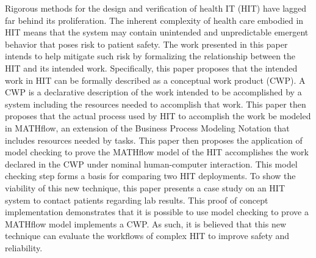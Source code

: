 Rigorous methods for the design and verification of health IT (HIT) have lagged far behind its proliferation. The inherent complexity of health care embodied in HIT means that the system may contain unintended and unpredictable emergent behavior that poses risk to patient safety. The work presented in this paper intends to help mitigate such risk by formalizing the relationship between the HIT and its intended work. Specifically, this paper proposes that the intended work in HIT can be formally described as a conceptual work product (CWP). A CWP is a declarative description of the work intended to be accomplished by a system including the resources needed to accomplish that work. This paper then proposes that the actual process used by HIT to accomplish the work be modeled in MATHflow, an extension of the Business Process Modeling Notation that includes resources needed by tasks. This paper then proposes the application of model checking to prove the MATHflow model of the HIT accomplishes the work declared in the CWP under nominal human-computer interaction. This model checking step forms a basis for comparing two HIT deployments. To show the viability of this new technique, this paper presents a case study on an HIT system to contact patients regarding lab results. This proof of concept implementation demonstrates that it is possible to use model checking to prove a MATHflow model implements a CWP. As such, it is believed that this new technique can evaluate the workflows of complex HIT to improve safety and reliability. 
